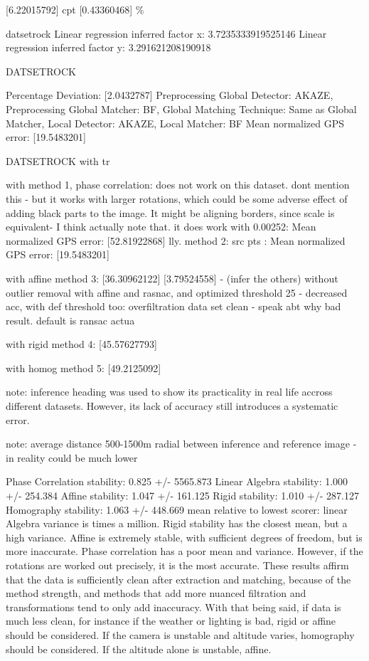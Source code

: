 [6.22015792] cpt [0.43360468] \%


datsetrock
Linear regression inferred factor x: 3.7235333919525146
Linear regression inferred factor y: 3.291621208190918


DATSETROCK

Percentage Deviation: [2.0432787] %
Preprocessing Global Detector: AKAZE, Preprocessing Global Matcher: BF, Global Matching Technique: Same as Global Matcher, Local Detector: AKAZE, Local Matcher: BF
Mean normalized GPS error: [19.5483201]




DATSETROCK with tr


with method 1, phase correlation: does not work on this dataset. dont mention this - but it works with larger rotations, which could be some adverse effect of adding black parts to the image. It might be aligning borders, since scale is equivalent- I think actually note that. it does work with 0.00252: Mean normalized GPS error: [52.81922868]
lly. 
 method 2: src pts : Mean normalized GPS error: [19.5483201]

with affine method 3: [36.30962122] [3.79524558] - (infer the others) without outlier removal
with affine and rasnac, and optimized threshold 25 - decreased acc, with def threshold too: overfiltration data set clean - speak abt why bad result. default is ransac actua

with rigid method 4: [45.57627793]

with homog method 5: [49.2125092]



note: inference heading was used to show its practicality in real life accross different datasets. However, its lack of accuracy still introduces a systematic error. 

note: average distance 500-1500m radial between inference and reference image - in reality could be much lower 


Phase Correlation stability: 0.825 +/- 5565.873
Linear Algebra stability: 1.000 +/- 254.384
Affine stability: 1.047 +/- 161.125
Rigid stability: 1.010 +/- 287.127
Homography stability: 1.063 +/- 448.669
mean relative to lowest scorer: linear Algebra
variance is times a million. 
Rigid stability has the closest mean, but a high variance. Affine is extremely stable, with sufficient degrees of freedom, but is more inaccurate. Phase correlation has a poor mean and variance. However, if the rotations are worked out precisely, it is the most accurate. 
These results affirm that the data is sufficiently clean after extraction and matching, because of the method strength, and methods that add more nuanced filtration and transformations tend to only add inaccuracy. With that being said, if data is much less clean, for instance if the weather or lighting is bad, rigid or affine should be considered. If the camera is unstable and altitude varies, homography should be considered. If the altitude alone is unstable, affine. 


